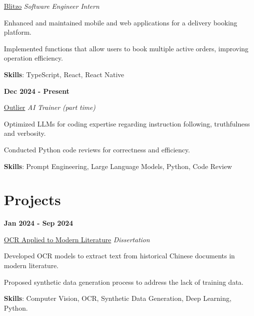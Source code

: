 \documentclass[9pt,a4paper]{article} %
\newenvironment{itemize-noindent}
{
\setlength{\leftmargini}{1em}
\begin{itemize}
\setlength{\itemsep}{0pt}
\setlength{\parskip}{0pt}
}
{\end{itemize}}
\begin{document}
\begin{multicols}{2}
\href{https://blitzo.co.uk}{Blitzo} \hfill \textit{Software Engineer Intern}

\begin{itemize-noindent}
    \item Enhanced and maintained mobile and web applications for a delivery booking platform.
    \item Implemented functions that allow users to book multiple active orders, improving operation efficiency.
    \item \textbf{Skills}: TypeScript, React, React Native
\end{itemize-noindent}
\vspace{2mm}


\textbf{Dec 2024 - Present}

\href{https://outlier.ai}{Outlier} \hfill \textit{AI Trainer (part time)}

\begin{itemize-noindent}
    \item Optimized LLMs for coding expertise regarding instruction following, truthfulness and verbosity.
    \item Conducted Python code reviews for correctness and efficiency.
    \item \textbf{Skills}: Prompt Engineering, Large Language Models, Python, Code Review
\end{itemize-noindent}


\section{Projects}

\textbf{Jan 2024 - Sep 2024}

\href{https://github.com/Stx666Michael/MSc-Individual-Project}{OCR Applied to Modern Literature} \hfill \textit{Dissertation}

\begin{itemize-noindent}
    \item Developed OCR models to extract text from historical Chinese documents in modern literature.
    \item Proposed synthetic data generation process to address the lack of training data.
    \item \textbf{Skills}: Computer Vision, OCR, Synthetic Data Generation, Deep Learning, Python.
\end{itemize-noindent}
\vspace{2mm}


\end{multicols}
\end{document}
